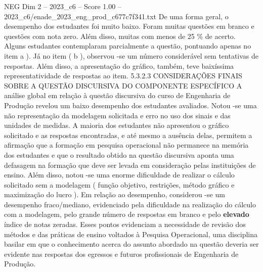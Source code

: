 \begin{textsample}{NEG Dim 2 – 2023\_c6 – Score 1.00 – 2023\_c6/enade\_2023\_eng\_prod\_c677c7f341.txt}
De uma forma geral, o desempenho dos estudantes foi muito baixo.
Foram muitas questões em branco e questões com nota zero.
Além disso, muitas com menos de 25 \% de acerto.
Alguns estudantes contemplaram parcialmente a questão, pontuando apenas no item a ).
Já no item ( b ), observou -se um número considerável sem tentativas de respostas.
Além disso, a apresentação do gráfico, também, teve baixíssima representatividade de respostas ao item. 5.3.2.3 CONSIDERAÇÕES FINAIS SOBRE A QUESTÃO DISCURSIVA DO COMPONENTE ESPECÍFICO A análise global em relação à questão discursiva do curso de Engenharia de Produção revelou um baixo desempenho dos estudantes avaliados.
Notou -se uma não representação da modelagem solicitada e erro no uso dos sinais e das unidades de medidas.
A maioria dos estudantes não apresentou o gráfico solicitado e as respostas encontradas, e até mesmo a ausência delas, permitem a afirmação que a formação em pesquisa operacional não permanece na memória dos estudantes e que o resultado obtido na questão discursiva aponta uma defasagem na formação que deve ser levada em consideração pelas instituições de ensino.
Além disso, notou -se uma enorme dificuldade de realizar o cálculo solicitado sem a modelagem ( função objetivo, restrições, método gráfico e maximização do lucro ).
Em relação ao desempenho, considerou -se um desempenho fraco/mediano, evidenciado pela dificuldade na realização do cálculo com a modelagem, pelo grande número de respostas em branco e pelo \textbf{elevado} índice de notas zeradas.
Esses pontos evidenciam a necessidade de revisão dos métodos e das práticas de ensino voltados à Pesquisa Operacional, uma disciplina basilar em que o conhecimento acerca do assunto abordado na questão deveria ser evidente nas respostas dos egressos e futuros profissionais de Engenharia de Produção.

\end{textsample}
